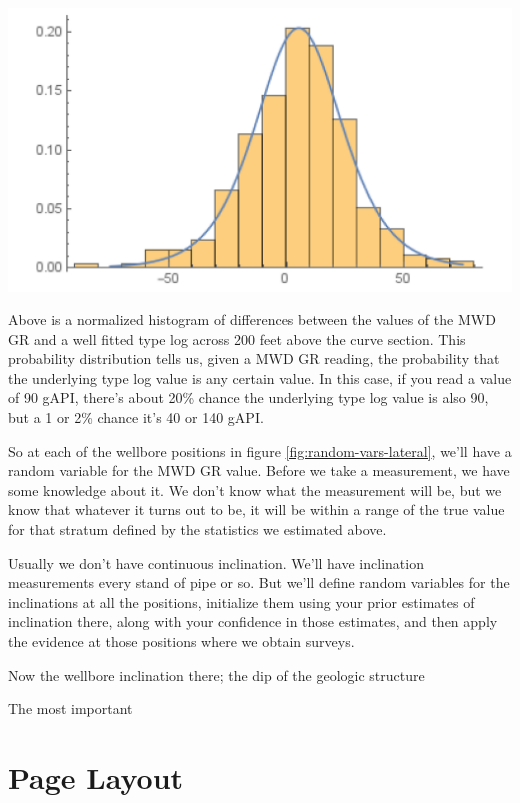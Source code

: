 \documentclass{tufte-handout}
\begin{document}
\begin{marginfigure}
  \includegraphics{log-histogram}
  \caption{Above is a normalized histogram of 
  differences between the values of the MWD GR and a well fitted 
  type log across 200 feet above the curve section. This probability distribution tells us,
  given a MWD GR reading, the probability that the underlying
  type log value is any certain value. In this case, if you read a
  value of 90 gAPI, there's about 20\% chance the underlying type log
  value is also 90, but a 1 or 2\% chance it's 40 or 140 gAPI. }
  \label{fig:log-histogram}
\end{marginfigure}

So at each of the wellbore positions in figure \ref{fig:random-vars-lateral}, we'll have a random variable for the MWD GR value. Before we take a measurement, we have some knowledge about it. We don't know what the measurement will be, but we know that whatever it turns out to be, it will be within a range of the true value for that stratum defined by the statistics we estimated above.   

Usually we don't have continuous inclination. We'll have inclination measurements every stand of pipe or so. But we'll define random variables for the inclinations at all the positions, initialize them using your prior estimates of inclination there, along with your confidence in those estimates, and then apply the evidence at those positions where we obtain surveys.

Now the wellbore inclination there; the dip of the geologic
structure 


The most important 

\section{Page Layout}\label{sec:page-layout}
\end{document}
